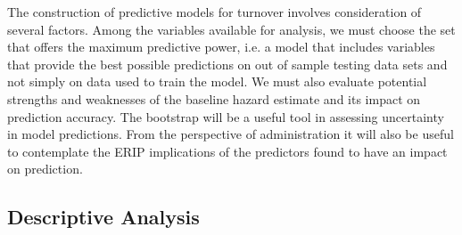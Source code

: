 \documentclass[12pt,letterpaper]{article}
\begin{document}
The construction of predictive models for turnover involves consideration of several factors. Among the variables available for analysis, we must choose the set that offers the maximum predictive power, i.e. a model that includes variables that provide the best possible predictions on out of sample testing data sets and not simply on data used to train the model. We must also evaluate potential strengths and weaknesses of the baseline hazard estimate and its impact on prediction accuracy.  The bootstrap will be a useful tool in assessing uncertainty in model predictions. From the perspective of administration it will also be useful to contemplate the ERIP implications of the predictors found to have an impact on prediction.

\subsection{Descriptive Analysis}
\end{document}
